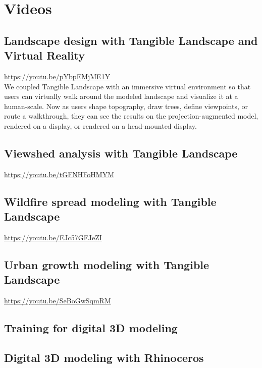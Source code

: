 \documentclass[prodmode,acmtochi]{acmsmall} %
\begin{document}
\vfill

\clearpage

\section{Videos}\label{appendix:videos}

\subsection{Landscape design with Tangible Landscape and Virtual Reality}\label{videos:tl_vr}
\url{https://youtu.be/pYbpEMjME1Y}\\

We coupled Tangible Landscape with an immersive virtual environment so that users can virtually walk around the modeled landscape and visualize it at a human-scale. Now as users shape topography, draw trees, define viewpoints, or route a walkthrough, they can see the results on the projection-augmented model, rendered on a display, or rendered on a head-mounted display.

\subsection{Viewshed analysis with Tangible Landscape}\label{videos:viewshed}
\url{https://youtu.be/tGFNHFoHMYM}

\subsection{Wildfire spread modeling with Tangible Landscape}\label{videos:fire}
\url{https://youtu.be/EJc57GFJeZI}

\subsection{Urban growth modeling with Tangible Landscape}\label{videos:urban}
\url{https://youtu.be/SeBoGwSqmRM}

\subsection{Training for digital 3D modeling}\label{videos:training}

\subsection{Digital 3D modeling with Rhinoceros}\label{videos:digital}
\end{document}
